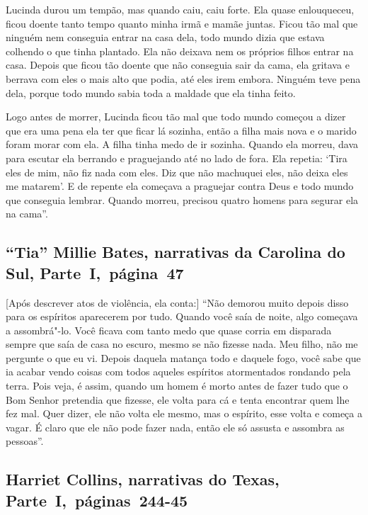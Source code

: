 Lucinda durou um tempão, mas quando caiu, caiu forte. Ela quase
enlouqueceu, ficou doente tanto tempo quanto minha irmã e mamãe juntas.
Ficou tão mal que ninguém nem conseguia entrar na casa dela, todo mundo
dizia que estava colhendo o que tinha plantado. Ela não deixava nem os
próprios filhos entrar na casa. Depois que ficou tão doente que não
conseguia sair da cama, ela gritava e berrava com eles o mais alto que
podia, até eles irem embora. Ninguém teve pena dela, porque todo mundo
sabia toda a maldade que ela tinha feito.

Logo antes de morrer, Lucinda ficou tão mal que todo mundo começou a
dizer que era uma pena ela ter que ficar lá sozinha, então a filha mais
nova e o marido foram morar com ela. A filha tinha medo de ir sozinha.
Quando ela morreu, dava para escutar ela berrando e praguejando até no
lado de fora. Ela repetia: `Tira eles de mim, não fiz nada com eles. Diz
que não machuquei eles, não deixa eles me matarem'. E de repente ela
começava a praguejar contra Deus e todo mundo que conseguia lembrar.
Quando morreu, precisou quatro homens para segurar ela na cama''.

\subsection{``Tia'' Millie Bates, narrativas da Carolina do Sul, Parte~I,~página~47} \label{ref21}

{[}Após descrever atos de violência, ela conta:{]} ``Não demorou muito
depois disso para os espíritos aparecerem por tudo. Quando você saía de
noite, algo começava a assombrá"-lo. Você ficava com tanto medo que quase
corria em disparada sempre que saía de casa no escuro, mesmo se não
fizesse nada. Meu filho, não me pergunte o que eu vi. Depois daquela
matança todo e daquele fogo, você sabe que ia acabar vendo coisas com %
todos aqueles espíritos atormentados rondando pela terra. Pois veja, é
assim, quando um homem é morto antes de fazer tudo que o Bom Senhor
pretendia que fizesse, ele volta para cá e tenta encontrar quem lhe fez
mal. Quer dizer, ele não volta ele mesmo, mas o espírito, esse volta e
começa a vagar. É claro que ele não pode fazer nada, então ele só
assusta e assombra as pessoas''.

\subsection{Harriet Collins, narrativas do Texas, Parte~I,~páginas~244-45} \label{ref58}

